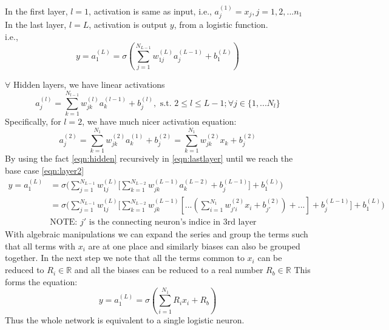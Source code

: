 \documentclass[a4paper,doc,notimes]{article}
\begin{document}
In the first layer, $l=1$, activation is same as input, i.e., $a^{(1)}_j = x_j, j=1, 2, ... n_1$ \\ 

In the last layer, $l=L$, activation is output $y$, from a logistic function. \\
 i.e.,
 \begin{equation}\label{eqn:lastlayer}
	 y = a^{(L)}_1 = \sigma(\sum_{j=1}^{N_{L-1}} w^{(L)}_{1j} a^{(L-1)}_j + b^{(L)}_1 )
 \end{equation} 
 
$\forall $ Hidden layers, we have linear activations \\
\begin{equation}\label{eqn:hidden}
 a^{(l)}_{j} = \sum_{k=1}^{N_{l-1}} w^{(l)}_{jk} a^{(l-1)}_k + b^{(l)}_j , \text{  s.t.  }  2 \le l \le L-1; \forall j \in \{1, ... N_l\}
\end{equation}
Specifically, for $l = 2$, we have much nicer activation equation:
\begin{equation} \label{eqn:layer2}
	a^{(2)}_{j} =  \sum_{k=1}^{N_{1}} w^{(2)}_{jk} a^{(1)}_k + b^{(2)}_j =  \sum_{k=1}^{N_{1}} w^{(2)}_{jk} x_k + b^{(2)}_j
\end{equation}
By using the fact \ref{eqn:hidden} recursively in \ref{eqn:lastlayer} until we reach the base case \ref{eqn:layer2}
  \begin{align*}
 	 y = a^{(L)}_1 & = \sigma\bigg(\sum_{j=1}^{N_{L-1}} w^{(L)}_{1j} \big[ \sum_{k=1}^{N_{L-2}} w^{(L-1)}_{jk} a^{(L-2)}_k + b^{(L-1)}_j  \big] + b^{(L)}_1 \bigg) \\
 	 & =  \sigma\bigg(\sum_{j=1}^{N_{L-1}} w^{(L)}_{1j} \big[ \sum_{k=1}^{N_{L-2}} w^{(L-1)}_{jk} [ ... ( \sum_{i=1}^{N_{1}} w^{(2)}_{j'i} x_i + b^{(2)}_{j'} ) +  ... ] + b^{(L-1)}_j  \big] + b^{(L)}_1 \bigg) \\
	 	 & \text{NOTE: $j'$ is the connecting neuron's indice in 3rd layer}
 \end{align*}
 With algebraic manipulations we can expand the series and group the terms such that all terms with $x_i$ are at one place and similarly biases can also be grouped together.
 In the next step we note that all the terms common to $x_i$  can be reduced to $R_i \in \mathbb{R}$ and all the biases can be reduced to a real number $R_b \in \mathbb{R}$
 This forms the equation:
\begin{equation}
	 y = a^{(L)}_1  = \sigma(\sum_{i=1}^{N_1} R_i x_i + R_b)
\end{equation}
Thus the whole network is equivalent to a single logistic neuron.
\end{document}
